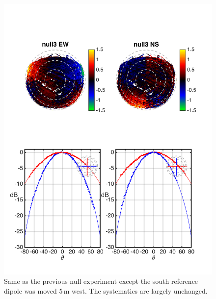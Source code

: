\documentclass{emulateapj}
\begin{document}
\begin{figure}[h]
\includegraphics[width=6.5in]{null3_rel.png}
\caption{Same as the previous null experiment except the south reference dipole was moved 5\,m west. The systematics are largely unchanged.}
\label{fig:null3}
\end{figure}
\end{document}
